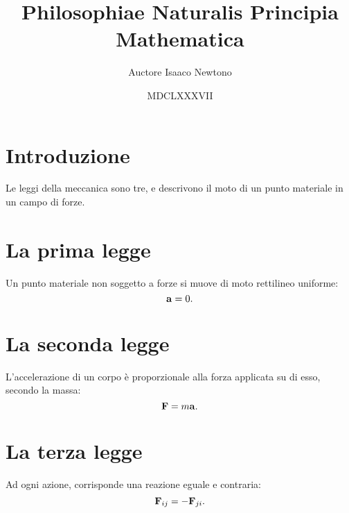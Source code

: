 \documentclass{article}
\title{Philosophiae Naturalis Principia Mathematica}
\author{Auctore Isaaco Newtono}
\date{MDCLXXXVII}
\begin{document}
\maketitle

\section{Introduzione}
Le leggi della meccanica sono tre, e descrivono il moto di un punto materiale in un campo di forze.

\section{La prima legge}
Un punto materiale non soggetto a forze si muove di moto rettilineo uniforme:
\begin{equation}
	\vb a = 0.
\end{equation}

\section{La seconda legge}
L'accelerazione di un corpo \`e proporzionale alla forza applicata su di esso, secondo la massa:
\begin{equation}
	\vb F = m \vb a.
\end{equation}

\section{La terza legge}
Ad ogni azione, corrisponde una reazione eguale e contraria:
\begin{equation}
	\vb F_{ij} = - \vb F_{ji}.
\end{equation}
\end{document}
